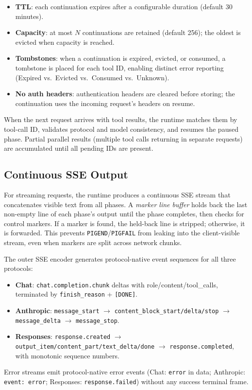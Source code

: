 \begin{itemize}[nosep]
    \item \textbf{TTL}: each continuation expires after a configurable duration (default 30 minutes).
    \item \textbf{Capacity}: at most $N$ continuations are retained (default 256); the oldest is evicted when capacity is reached.
    \item \textbf{Tombstones}: when a continuation is expired, evicted, or consumed, a tombstone is placed for each tool ID, enabling distinct error reporting (Expired vs.\ Evicted vs.\ Consumed vs.\ Unknown).
    \item \textbf{No auth headers}: authentication headers are cleared before storing; the continuation uses the incoming request's headers on resume.
\end{itemize}

When the next request arrives with tool results, the runtime matches them by tool-call ID, validates protocol and model consistency, and resumes the paused phase. Partial parallel results (multiple tool calls returning in separate requests) are accumulated until all pending IDs are present.

\subsection{Continuous SSE Output}
\label{sec:sse}

For streaming requests, the runtime produces a continuous SSE stream that concatenates visible text from all phases. A \emph{marker line buffer} holds back the last non-empty line of each phase's output until the phase completes, then checks for control markers. If a marker is found, the held-back line is stripped; otherwise, it is forwarded. This prevents \texttt{PIGEND}/\texttt{PIGFAIL} from leaking into the client-visible stream, even when markers are split across network chunks.

The outer SSE encoder generates protocol-native event sequences for all three protocols:
\begin{itemize}[nosep]
    \item \textbf{Chat}: \texttt{chat.completion.chunk} deltas with role/content/tool\_calls, terminated by \texttt{finish\_reason} + \texttt{[DONE]}.
    \item \textbf{Anthropic}: \texttt{message\_start} $\rightarrow$ \texttt{content\_block\_start/delta/stop} $\rightarrow$ \texttt{message\_delta} $\rightarrow$ \texttt{message\_stop}.
    \item \textbf{Responses}: \texttt{response.created} $\rightarrow$ \texttt{output\_item/content\_part/text\_delta/done} $\rightarrow$ \texttt{response.completed}, with monotonic sequence numbers.
\end{itemize}

Error streams emit protocol-native error events (Chat: \texttt{error} in data; Anthropic: \texttt{event: error}; Responses: \texttt{response.failed}) without any success terminal frame.
